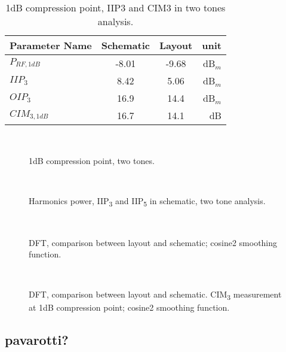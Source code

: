 \begin{table} [H]
	\label{tab:IIP3_2tone}
	\caption{1dB compression point, IIP3 and CIM3 in two tones analysis.}
	\centering	
	\begin{tabular}{lccr} 
		\toprule 
		Parameter Name			& Schematic 	& Layout & unit \\ 
		\midrule
		\(P_{RF,1dB}\) & -8.01 & -9.68 & dB\(_{m}\)\\
		\(IIP_{3}\)  & 8.42 & 5.06 & dB\(_{m}\) \\
		\(OIP_{3}\)  & 16.9 &14.4 & dB\(_{m}\) \\
		\(CIM_{3,1dB}\) & 16.7 & 14.1 & dB \\
		\bottomrule 
	\end{tabular}	
\end{table}

\begin{figure}[H] 
	\centering
	 \\
	\caption{1dB compression point, two tones.}
	\label{fig:1dB_2tones}
\end{figure}

\begin{figure}[H] 
	\centering
	 \\
	\caption{Harmonics power, IIP\textsubscript{3} and IIP\textsubscript{5} in schematic, two tone analysis.}
	\label{fig:IIP3_2t_schem}
\end{figure}

\begin{figure}[H] 
	\centering
	 \\
	\caption{DFT, comparison between layout and schematic; cosine2 smoothing function.}
	\label{fig:DFT_2ton}
\end{figure}

\begin{figure}[H] 
	\centering
	 \\
	\caption{DFT, comparison between layout and schematic. CIM\textsubscript{3} measurement at 1dB compression point; cosine2 smoothing function. }
	\label{fig:DFT_2ton_zoom}
\end{figure}

\subsection{pavarotti?}
